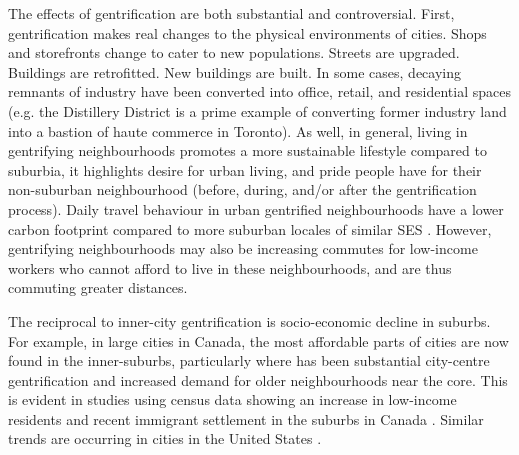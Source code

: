 The effects of gentrification are both substantial and controversial. First, gentrification makes real changes to the physical environments of cities. Shops and storefronts change to cater to new populations. Streets are upgraded. Buildings are retrofitted. New buildings are built. In some cases, decaying remnants of industry have been converted into office, retail, and residential spaces (e.g. the Distillery District is a prime example of converting former industry land into a bastion of haute commerce in Toronto). As well, in general, living in gentrifying neighbourhoods promotes a more sustainable lifestyle compared to suburbia, it highlights desire for urban living, and pride people have for their non-suburban neighbourhood (before, during, and/or after the gentrification process). Daily travel behaviour in urban gentrified neighbourhoods have a lower carbon footprint compared to more suburban locales of similar SES \cite{ewing_compactness_2015}. However, gentrifying neighbourhoods may also be increasing commutes for low-income workers who cannot afford to live in these neighbourhoods, and are thus commuting greater distances.

The reciprocal to inner-city gentrification is socio-economic decline in suburbs. For example, in large cities in Canada, the most affordable parts of cities are now found in the inner-suburbs, particularly where has been substantial city-centre gentrification and increased demand for older neighbourhoods near the core. This is evident in studies using census data showing an increase in low-income residents and recent immigrant settlement in the suburbs in Canada \cite{bourne_changing_2001,ades_are_2012,breau_pulling_2018}. Similar trends are occurring in cities in the United States \cite{ehrenhalt_great_2012,delmelle_differentiating_2017}.

